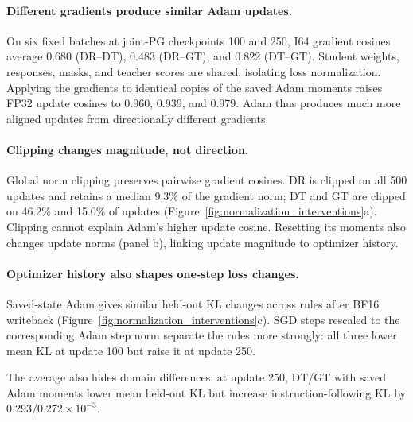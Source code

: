 \paragraph{Different gradients produce similar Adam updates.}
On six fixed batches at joint-PG checkpoints 100 and 250, I64 gradient cosines average 0.680 (DR--DT), 0.483 (DR--GT), and 0.822 (DT--GT). Student weights, responses, masks, and teacher scores are shared, isolating loss normalization. Applying the gradients to identical copies of the saved Adam moments raises FP32 update cosines to 0.960, 0.939, and 0.979. Adam thus produces much more aligned updates from directionally different gradients.

\paragraph{Clipping changes magnitude, not direction.}
Global norm clipping preserves pairwise gradient cosines. DR is clipped on all 500 updates and retains a median 9.3\% of the gradient norm; DT and GT are clipped on 46.2\% and 15.0\% of updates (Figure~\ref{fig:normalization_interventions}a). Clipping cannot explain Adam's higher update cosine. Resetting its moments also changes update norms (panel b), linking update magnitude to optimizer history.

\paragraph{Optimizer history also shapes one-step loss changes.}
Saved-state Adam gives similar held-out KL changes across rules after BF16 writeback (Figure~\ref{fig:normalization_interventions}c). SGD steps rescaled to the corresponding Adam step norm separate the rules more strongly: all three lower mean KL at update 100 but raise it at update 250.

The average also hides domain differences: at update 250, DT/GT with saved Adam moments lower mean held-out KL but increase instruction-following KL by $0.293/0.272\times10^{-3}$.



\FloatBarrier
